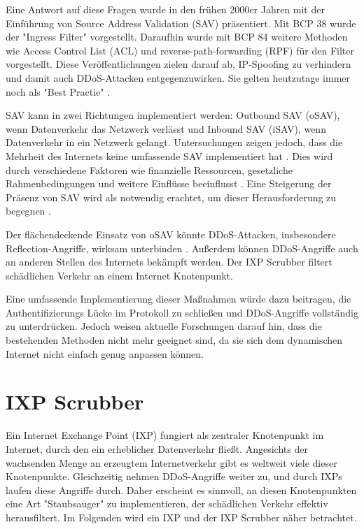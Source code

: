 \documentclass[sigplan,screen]{acmart}
\begin{document}
Eine Antwort auf diese Fragen wurde in den frühen 2000er Jahren mit der Einführung von Source Address Validation (SAV) präsentiert. Mit BCP 38 \cite{Ingress01} wurde der "Ingress Filter" vorgestellt. Daraufhin wurde mit BCP 84\cite{Bcp84} weitere Methoden wie Access Control List (ACL) und reverse-path-forwarding (RPF) für den Filter vorgestellt. Diese Veröffentlichungen zielen darauf ab, IP-Spoofing zu verhindern und damit auch DDoS-Attacken entgegenzuwirken. Sie gelten heutzutage immer noch als "Best Practie" \cite{Hal01}. 

SAV kann in zwei Richtungen implementiert werden: Outbound SAV (oSAV), wenn Datenverkehr das Netzwerk verlässt und Inbound SAV (iSAV), wenn Datenverkehr in ein Netzwerk gelangt. Untersuchungen zeigen jedoch, dass die Mehrheit des Internets keine umfassende SAV implementiert hat \cite{Spoofer01} \cite{CRP01}. Dies wird durch verschiedene Faktoren wie finanzielle Ressourcen, gesetzliche Rahmenbedingungen und weitere Einflüsse beeinflusst \cite{Hal01}. Eine Steigerung der Präsenz von SAV wird als notwendig erachtet, um dieser Herausforderung zu begegnen \cite{manrs01}.

Der flächendeckende Einsatz von oSAV könnte DDoS-Attacken, insbesondere Reflection-Angriffe, wirksam unterbinden \cite{FrontDoor01}. Außerdem können DDoS-Angriffe auch an anderen Stellen des Internets bekämpft werden. Der IXP Scrubber \cite{Hohlfeld01} filtert schädlichen Verkehr an einem Internet Knotenpunkt.

Eine umfassende Implementierung dieser Maßnahmen würde dazu beitragen, die Authentifizierungs Lücke im Protokoll zu schließen und DDoS-Angriffe vollständig zu unterdrücken. Jedoch weisen aktuelle Forschungen darauf hin, dass die bestehenden Methoden nicht mehr geeignet sind, da sie sich dem dynamischen Internet nicht einfach genug anpassen können.  

\section{IXP Scrubber}
Ein Internet Exchange Point (IXP) fungiert als zentraler Knotenpunkt im Internet, durch den ein erheblicher Datenverkehr fließt. Angesichts der wachsenden Menge an erzeugtem Internetverkehr gibt es weltweit viele dieser Knotenpunkte. Gleichzeitig nehmen DDoS-Angriffe weiter zu, und durch IXPs laufen diese Angriffe durch. Daher erscheint es sinnvoll, an diesen Knotenpunkten eine Art "Staubsauger" zu implementieren, der schädlichen Verkehr effektiv herausfiltert. Im Folgenden wird ein IXP und der IXP Scrubber näher betrachtet.
\end{document}
